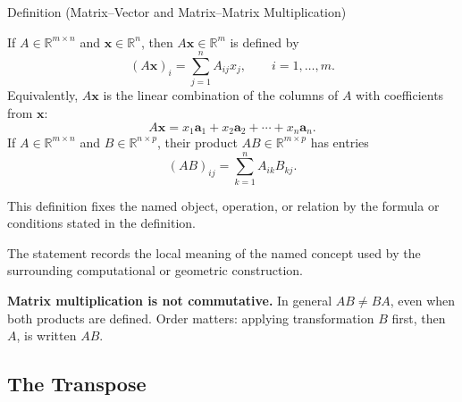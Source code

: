 \begin{definitionbox}{Definition (Matrix--Vector and Matrix--Matrix Multiplication)}
\begin{definition}
\label{def:matrix-vector-matrix-multiplication}
If $A \in \mathbb{R}^{m \times n}$ and $\mathbf{x} \in \mathbb{R}^n$, then
$A\mathbf{x} \in \mathbb{R}^m$ is defined by
\[
  (A\mathbf{x})_i = \sum_{j=1}^n A_{ij} x_j, \qquad i = 1, \ldots, m.
\]
Equivalently, $A\mathbf{x}$ is the linear combination of the columns of $A$
with coefficients from $\mathbf{x}$:
\[
  A\mathbf{x} = x_1 \mathbf{a}_1 + x_2 \mathbf{a}_2 + \cdots + x_n \mathbf{a}_n.
\]
If $A \in \mathbb{R}^{m \times n}$ and $B \in \mathbb{R}^{n \times p}$, their product
$AB \in \mathbb{R}^{m \times p}$ has entries
\[
  (AB)_{ij} = \sum_{k=1}^n A_{ik} B_{kj}.
\]
\end{definition}
\end{definitionbox}
\begin{remark*}
This definition fixes the named object, operation, or relation by the formula
or conditions stated in the definition.
\end{remark*}

\begin{remark*}[Interpretation]
The statement records the local meaning of the named concept used by the
surrounding computational or geometric construction.
\end{remark*}

\DefinitionalRoot

\begin{remark*}[Exposition]
\textbf{Matrix multiplication is not commutative.}
In general $AB \neq BA$, even when both products are defined.
Order matters: applying transformation $B$ first, then $A$, is written $AB$.
\end{remark*}

\subsection*{The Transpose}

